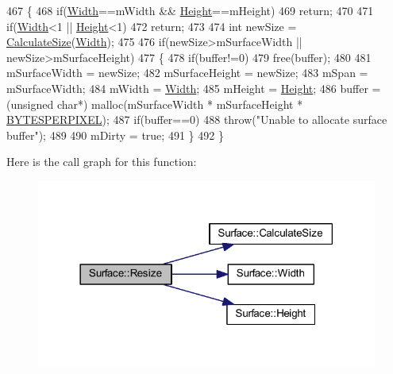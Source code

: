 \begin{DoxyCode}
467 \{
468     \textcolor{keywordflow}{if}(\hyperlink{class_surface_ae76d7c2fa208df6979a77cc60e8105c0}{Width}==mWidth && \hyperlink{class_surface_ab901f48d51b3fd427415b580dc15518c}{Height}==mHeight)
469         \textcolor{keywordflow}{return};
470 
471     \textcolor{keywordflow}{if}(\hyperlink{class_surface_ae76d7c2fa208df6979a77cc60e8105c0}{Width}<1 || \hyperlink{class_surface_ab901f48d51b3fd427415b580dc15518c}{Height}<1)
472         \textcolor{keywordflow}{return};
473 
474     \textcolor{keywordtype}{int} newSize = \hyperlink{class_surface_aeb8a8540f415a4d29c440667e8532e91}{CalculateSize}(\hyperlink{class_surface_ae76d7c2fa208df6979a77cc60e8105c0}{Width});
475 
476     \textcolor{keywordflow}{if}(newSize>mSurfaceWidth || newSize>mSurfaceHeight)
477     \{
478         \textcolor{keywordflow}{if}(buffer!=0)
479             free(buffer);
480 
481         mSurfaceWidth = newSize;
482         mSurfaceHeight = newSize;
483         mSpan = mSurfaceWidth;
484         mWidth = \hyperlink{class_surface_ae76d7c2fa208df6979a77cc60e8105c0}{Width};
485         mHeight = \hyperlink{class_surface_ab901f48d51b3fd427415b580dc15518c}{Height};
486         buffer = (\textcolor{keywordtype}{unsigned} \textcolor{keywordtype}{char}*) malloc(mSurfaceWidth * mSurfaceHeight * 
      \hyperlink{supportcode_8h_afb291d1c2072afc3383bc2e688e75d3b}{BYTESPERPIXEL});
487         \textcolor{keywordflow}{if}(buffer==0)
488             \textcolor{keywordflow}{throw}(\textcolor{stringliteral}{"Unable to allocate surface buffer"});
489 
490         mDirty = \textcolor{keyword}{true};
491     \}
492 \}
\end{DoxyCode}
Here is the call graph for this function\+:\nopagebreak
\begin{figure}[H]
\begin{center}
\leavevmode
\includegraphics[width=318pt]{class_surface_a5e45e936e3057fa1ddad0c7924767005_cgraph}
\end{center}
\end{figure}
\mbox{\label{class_surface_a377c59f6ef131d4b879cda93578a3efa}} 

